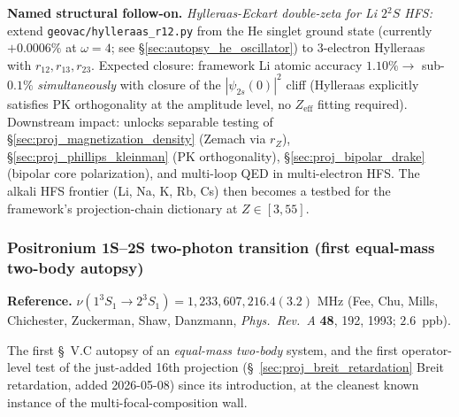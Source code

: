 \documentclass[11pt]{article}
\begin{document}
\textbf{Named structural follow-on.}  \emph{Hylleraas-Eckart double-zeta
for Li $2{}^2S$ HFS:} extend \texttt{geovac/hylleraas\_r12.py} from the
He singlet ground state (currently $+0.0006\%$ at $\omega=4$; see
\S\ref{sec:autopsy_he_oscillator}) to 3-electron Hylleraas with
$r_{12}, r_{13}, r_{23}$.  Expected closure: framework Li atomic accuracy
$1.10\% \to$ sub-$0.1\%$ \emph{simultaneously} with closure of the
$|\psi_{2s}(0)|^2$ cliff (Hylleraas explicitly satisfies PK orthogonality
at the amplitude level, no $Z_\text{eff}$ fitting required).  Downstream
impact: unlocks separable testing of \S\ref{sec:proj_magnetization_density}
(Zemach via $r_Z$), \S\ref{sec:proj_phillips_kleinman} (PK orthogonality),
\S\ref{sec:proj_bipolar_drake} (bipolar core polarization), and multi-loop
QED in multi-electron HFS.  The alkali HFS frontier (Li, Na, K, Rb, Cs)
then becomes a testbed for the framework's projection-chain dictionary
at $Z \in [3, 55]$.

\subsubsection{Positronium 1S--2S two-photon transition (first equal-mass two-body autopsy)}
\label{sec:autopsy_ps_1s2s}

\textbf{Reference.}  $\nu(1^3 S_1 \to 2^3 S_1) = 1{,}233{,}607{,}216.4(3.2)$
MHz (Fee, Chu, Mills, Chichester, Zuckerman, Shaw, Danzmann, \emph{Phys.\ Rev.\ A}
\textbf{48}, 192, 1993; $2.6$~ppb).

The first \S~V.C autopsy of an \emph{equal-mass two-body} system, and the
first operator-level test of the just-added 16th projection
(\S~\ref{sec:proj_breit_retardation} Breit retardation, added 2026-05-08)
since its introduction, at the cleanest known instance of the
multi-focal-composition wall.
\end{document}
